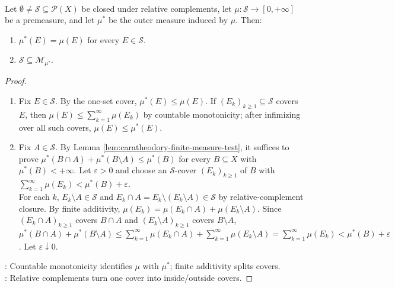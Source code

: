 \begin{theorem} \label{thm:relative-complement-premeasure-extension} \\
Let $\emptyset\neq\mathcal{S}\subseteq\mathcal{P}(X)$ be closed under relative complements, let $\mu:\mathcal{S}\to[0,+\infty]$ be a premeasure, and let $\mu^\ast$ be the outer measure induced by $\mu$. Then:
\begin{enumerate}[label=(\roman*)]
\setlength{\itemsep}{0pt}
\item $\mu^\ast(E)=\mu(E)$ for every $E\in\mathcal{S}$.
\item $\mathcal{S}\subseteq\mathcal{M}_{\mu^\ast}$.
\end{enumerate}
\begin{proof}
\begin{enumerate}[label=(\roman*)]
\setlength{\itemsep}{0pt}
\item Fix $E\in\mathcal{S}$. By the one-set cover, $\mu^\ast(E)\leq\mu(E)$. If $(E_k)_{k\geq1}\subseteq\mathcal{S}$ covers $E$, then $\mu(E)\leq\sum\limits_{k=1}^{\infty}\mu(E_k)$ by countable monotonicity; after infimizing over all such covers, $\mu(E)\leq\mu^\ast(E)$.
\item Fix $A\in\mathcal{S}$. By Lemma \ref{lem:caratheodory-finite-measure-test}, it suffices to prove $\mu^\ast(B\cap A)+\mu^\ast(B\setminus A)\leq\mu^\ast(B)$ for every $B\subseteq X$ with $\mu^\ast(B)<+\infty$. Let $\varepsilon>0$ and choose an $\mathcal{S}$-cover $(E_k)_{k\geq1}$ of $B$ with $\sum\limits_{k=1}^{\infty}\mu(E_k)<\mu^\ast(B)+\varepsilon$.\\
For each $k$, $E_k\setminus A\in\mathcal{S}$ and $E_k\cap A=E_k\setminus(E_k\setminus A)\in\mathcal{S}$ by relative-complement closure. By finite additivity, $\mu(E_k)=\mu(E_k\cap A)+\mu(E_k\setminus A)$. Since $(E_k\cap A)_{k\geq1}$ covers $B\cap A$ and $(E_k\setminus A)_{k\geq1}$ covers $B\setminus A$, $\mu^\ast(B\cap A)+\mu^\ast(B\setminus A)\leq\sum\limits_{k=1}^{\infty}\mu(E_k\cap A)+\sum\limits_{k=1}^{\infty}\mu(E_k\setminus A)=\sum\limits_{k=1}^{\infty}\mu(E_k)<\mu^\ast(B)+\varepsilon$. Let $\varepsilon\downarrow0$.
\end{enumerate}
: Countable monotonicity identifies $\mu$ with $\mu^\ast$; finite additivity splits covers.\\
: Relative complements turn one cover into inside/outside covers.
\end{proof}
\end{theorem}


